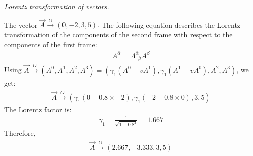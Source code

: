 \documentclass{report}
\begin{document}
\begin{subquests}
	\item \emph{Lorentz transformation of vectors.}
	\begin{subquests}
		\item
		The vector ${\vec A} \stackrel{O}{\longrightarrow}(0,-2,3,5).$ The following equation describes the Lorentz transformation of the components of the second frame with respect to the components of the first frame:
		\begin{gather*}
			A^{\bar{\alpha}}=\Lambda^{\bar{\alpha}}_{\;\;\beta}A^{\beta} 
		\end{gather*}
		Using ${\vec A} \stackrel{\bar{O}}{\longrightarrow}\left(A^{\bar{0}},A^{\bar{1}},A^{\bar{2}},A^{\bar{3}}\right) = (\gamma_{1}(A^0-vA^1),\gamma_{1}(A^1-vA^0),A^2,A^3)$, we get:
		\begin{gather*}
			{\vec A} \stackrel{\bar{O}}{\longrightarrow}(\gamma_{1}(0-0.8\times-2),\gamma_{1}(-2-0.8\times0),3,5)
		\end{gather*}
		The Lorentz factor is:
		\begin{gather*}
			\gamma_{1} = \frac{1}{\sqrt{1-0.8^2}} = 1.667 
		\end{gather*}
		Therefore,
		\begin{gather*}
			{\vec A} \stackrel{\bar{O}}{\longrightarrow} (2.667,-3.333,3,5)
		\end{gather*}
				

\end{subquests}
\end{subquests}
\end{document}
